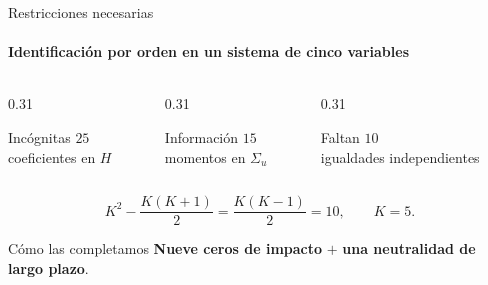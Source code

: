 \documentclass{beamer}
\begin{document}
\begin{frame}{Restricciones necesarias}
 \framesubtitle{Identificación por orden en un sistema de cinco variables}
 \begin{columns}[c]
  \begin{column}{0.31\textwidth}
   \begin{block}{Incógnitas}
    \centering\LARGE $25$\\[0.3em]
    \scriptsize coeficientes en $H$
   \end{block}
  \end{column}
  \begin{column}{0.31\textwidth}
   \begin{block}{Información}
    \centering\LARGE $15$\\[0.3em]
    \scriptsize momentos en $\Sigma_u$
   \end{block}
  \end{column}
  \begin{column}{0.31\textwidth}
   \begin{alertblock}{Faltan}
    \centering\LARGE $10$\\[0.3em]
    \scriptsize igualdades independientes
   \end{alertblock}
  \end{column}
 \end{columns}
 \vspace{0.4cm}
 \begin{equation*}
 K^2-\frac{K(K+1)}{2}=\frac{K(K-1)}{2}=10,\qquad K=5.
 \end{equation*}
 \vfill
 \begin{block}{Cómo las completamos}
   \centering\small \textbf{Nueve ceros de impacto} $+$ \textbf{una neutralidad de largo plazo}.
 \end{block}
\end{frame}
\end{document}
